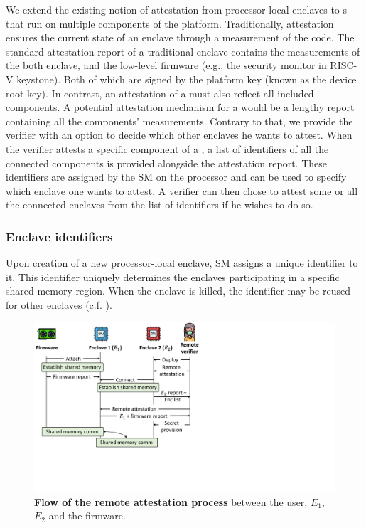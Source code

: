 We extend the existing notion of attestation from processor-local enclaves to \nameenclave{}s that run on multiple components of the platform. Traditionally, attestation ensures the current state of an enclave through a measurement of the code. The standard attestation report of a traditional enclave contains the measurements of the both enclave, and the low-level firmware (e.g., the security monitor in RISC-V keystone). Both of which are signed by the platform key (known as the device root key). In contrast, an attestation of a \nameenclave{} must also reflect all included components. 
A potential attestation mechanism for a \nameenclave{} would be a lengthy report containing all the components' measurements. %
Contrary to that, we provide the verifier with an option to decide which other enclaves he wants to attest. When the verifier attests a specific component of a \nameenclave, a list of identifiers of all the connected components is provided alongside the attestation report. These identifiers are assigned by the SM on the processor and can be used to specify which enclave one wants to attest. A verifier can then chose to attest some or all the connected enclaves from the list of identifiers if he wishes to do so.


\subsubsection{Enclave identifiers} 
Upon creation of a new processor-local enclave, SM assigns a unique identifier to it. This identifier uniquely determines the enclaves participating in a specific shared memory region. When the enclave is killed, the identifier may be reused for other enclaves (c.f. ).


\begin{figure}[t]
  \centering
  \includegraphics[trim={0 5cm 15cm 0}, clip, width=.8\linewidth]{chapters/PIE/images/localAttestation.pdf}
  \caption[Flow of remote attestation process between \nameenclave{}'s components]{\textbf{Flow of the remote attestation process} between the user, $E_1$, $E_2$ and the \sphw firmware.} %
  \label{fig:attestationFlow}
\end{figure}

